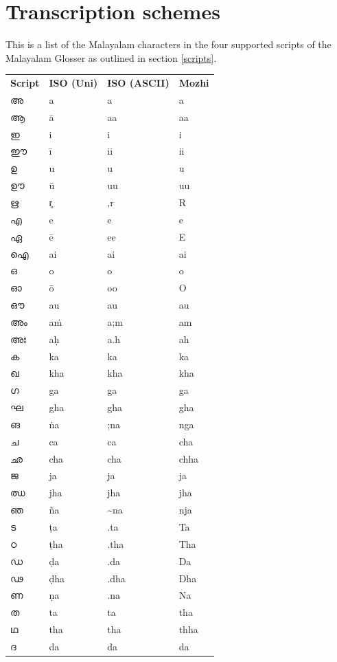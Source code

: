 \documentclass[a4paper]{article}
\newcommand{\ipa}[1]{{\cmuIPA{}#1}}
\begin{document}
\section{Transcription schemes}

This is a list of the Malayalam characters in the four supported scripts of the Malayalam Glosser as outlined in section \ref{scripts}.

\begin{longtable}[l]{p{2.3cm} p{2.3cm} p{2.3cm} p{2.3cm}}
\textbf{Script} & \textbf{ISO (Uni)} & \textbf{ISO (ASCII)} & \textbf{Mozhi} \\[1ex]
അ & a & a & a \\
ആ & ā & aa & aa \\
ഇ & i & i & i \\
ഈ & ī & ii & ii \\
ഉ & u & u & u \\
ഊ & ū & uu & uu \\
ഋ & \ipa{r̥} & ,r & R \\
എ & e & e & e \\
ഏ & ē & ee & E \\
ഐ & ai & ai & ai \\
ഒ & o & o & o \\
ഓ & ō & oo & O \\
ഔ & au & au & au \\
അം & aṁ & a;m & am \\
അഃ & aḥ & a.h & ah \\
ക & ka & ka & ka \\
ഖ & kha & kha & kha \\
ഗ & ga & ga & ga \\
ഘ & gha & gha & gha \\
ങ & ṅa & ;na & nga \\
ച & ca & ca & cha \\
ഛ & cha & cha & chha \\
ജ & ja & ja & ja \\
ഝ & jha & jha & jha \\
ഞ & ña & \textasciitilde{}na & nja \\
ട & ṭa & .ta & Ta \\
ഠ & ṭha & .tha & Tha \\
ഡ & ḍa & .da & Da \\
ഢ & ḍha & .dha & Dha \\
ണ & ṇa & .na & Na \\
ത & ta & ta & tha \\
ഥ & tha & tha & thha \\
ദ & da & da & da \\

\end{longtable}
\end{document}
